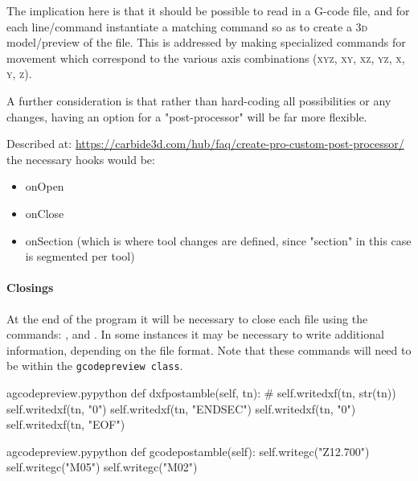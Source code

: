 \documentclass{ltxdoc}
\begin{document}
The implication here is that it should be possible to read in a G-code file, and for each line/\allowbreak command instantiate a matching command so as to create a \textsc{3d} model/preview  of the file. This is addressed by making specialized commands for movement which correspond to the various axis combinations (\textsc{xyz}, \textsc{xy}, \textsc{xz}, \textsc{yz}, \textsc{x}, \textsc{y}, \textsc{z}).

A further consideration is that rather than hard-coding all possibilities or any changes, having an option for a "post-processor" will be far more flexible.

Described at: \url{https://carbide3d.com/hub/faq/create-pro-custom-post-processor/} the necessary hooks would be:

\begin{itemize}
\item onOpen
\item onClose
\item onSection (which is where tool changes are defined, since "section" in this case is segmented per tool)
\end{itemize}



\paragraph{Closings}

At the end of the program it will be necessary to close each file using the commands: 
, and
. %
In some instances it may be necessary to write additional information, depending on the file format. Note that these commands will need to be within the \verb|gcodepreview class|.
 
\lstset{firstnumber=\thegcpy}
\begin{writecode}{a}{gcodepreview.py}{python}
    def dxfpostamble(self, tn):
#        self.writedxf(tn, str(tn))
        self.writedxf(tn, "0")
        self.writedxf(tn, "ENDSEC")
        self.writedxf(tn, "0")
        self.writedxf(tn, "EOF")
        
\end{writecode}
\addtocounter{gcpy}{7}

\lstset{firstnumber=\thegcpy}
\begin{writecode}{a}{gcodepreview.py}{python}
    def gcodepostamble(self):
        self.writegc("Z12.700")
        self.writegc("M05")
        self.writegc("M02")
        
\end{writecode}
\addtocounter{gcpy}{5}
\end{document}
